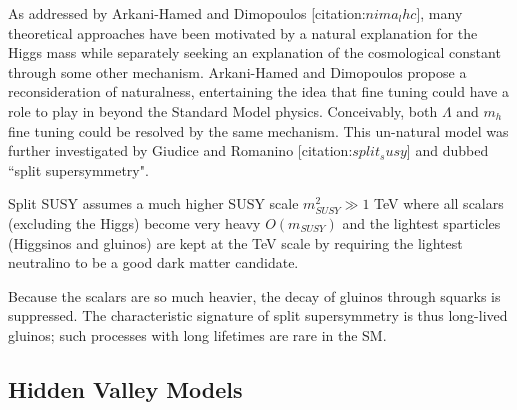 As addressed by Arkani-Hamed and Dimopoulos [citation:$nima_lhc$], many theoretical approaches  have been
 motivated by a natural explanation for the Higgs mass while separately seeking an  explanation
 of the cosmological constant through some other mechanism.
Arkani-Hamed and Dimopoulos propose a reconsideration of naturalness, entertaining the idea that 
fine tuning could have a role to play in beyond the Standard Model physics.
Conceivably, both $\Lambda$ and $m_h$ fine tuning could be resolved by the same mechanism.  
This un-natural model was  further investigated by Giudice and Romanino [citation:$split_susy$]
and dubbed ``split supersymmetry". 

Split SUSY assumes a much higher SUSY scale $m_{SUSY}^2 \gg 1$ TeV where all scalars (excluding the Higgs) 
become very heavy $O(m_{SUSY})$ and the lightest sparticles (Higgsinos and gluinos) are kept at the TeV scale by requiring the lightest neutralino to be a good dark matter candidate. 

Because the scalars are so much heavier, the decay of gluinos through squarks is suppressed.
The characteristic signature of split supersymmetry is thus long-lived gluinos; such processes 
with long lifetimes are rare in the SM.

\subsection{Hidden Valley Models} 
